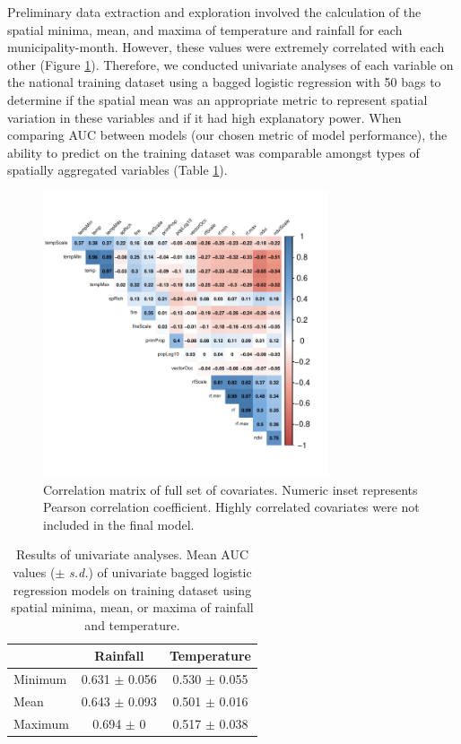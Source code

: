 \documentclass{article}
\begin{document}
Preliminary data extraction and exploration involved the calculation of the spatial minima, mean, and maxima of temperature and rainfall for each municipality-month.
However, these values were extremely correlated with each other (Figure \ref{fig:corrmat}).
Therefore, we conducted univariate analyses of each variable on the national training dataset using a bagged logistic regression with 50 bags to determine if the spatial mean was an appropriate metric to represent spatial variation in these variables and if it had high explanatory power.
When comparing AUC between models (our chosen metric of model performance), the ability to predict on the training dataset was comparable amongst types of spatially aggregated variables (Table \ref{table:univarateAnalyses}).

\begin{figure}
\centering
\includegraphics[width=0.75\textwidth]{correlationMatrix}
\caption{Correlation matrix of full set of covariates. Numeric inset represents Pearson correlation coefficient. Highly correlated covariates were not included in the final model.}
\label{fig:corrmat}
\end{figure}

\begin{table} [h]
\normalsize
\centering
\caption{Results of univariate analyses. Mean AUC values ($\pm$ \textit{s.d.}) of univariate bagged logistic regression models on training dataset using spatial minima, mean, or maxima of rainfall and temperature.}
\label{table:univarateAnalyses}
\begin{tabular}{lcc}
          & Rainfall                     & Temperature                   \\ \hline
Minimum   & 0.631 $\pm$ 0.056              & 0.530 $\pm$ 0.055                          \\
Mean      & 0.643 $\pm$ 0.093              & 0.501 $\pm$ 0.016                         \\
Maximum   & 0.694 $\pm$ 0                  & 0.517 $\pm$ 0.038
\end{tabular}
\begin{flushleft}
\smallskip

\end{flushleft}
\end{table}
\end{document}

